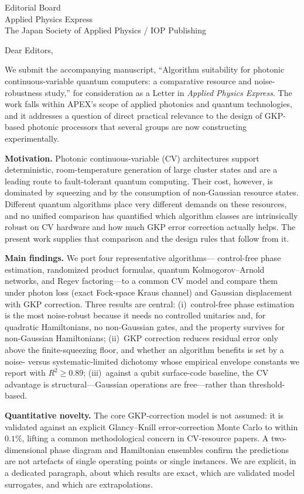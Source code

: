 \documentclass[11pt]{letter}
\begin{document}
\begin{letter}{Editorial Board \\ Applied Physics Express \\
The Japan Society of Applied Physics / IOP Publishing}

\opening{Dear Editors,}

We submit the accompanying manuscript, ``Algorithm suitability for
photonic continuous-variable quantum computers: a comparative resource
and noise-robustness study,'' for consideration as a Letter in
\emph{Applied Physics Express}. The work falls within APEX's scope of
applied photonics and quantum technologies, and it addresses a question
of direct practical relevance to the design of GKP-based photonic
processors that several groups are now constructing experimentally.

\textbf{Motivation.} Photonic continuous-variable (CV) architectures
support deterministic, room-temperature generation of large cluster
states and are a leading route to fault-tolerant quantum computing.
Their cost, however, is dominated by squeezing and by the consumption of
non-Gaussian resource states. Different quantum algorithms place very
different demands on these resources, and no unified comparison has
quantified which algorithm classes are intrinsically robust on CV
hardware and how much GKP error correction actually helps. The present
work supplies that comparison and the design rules that follow from it.

\textbf{Main findings.} We port four representative algorithms---%
control-free phase estimation, randomized product formulas, quantum
Kolmogorov--Arnold networks, and Regev factoring---to a common CV model
and compare them under photon loss (exact Fock-space Kraus channel) and
Gaussian displacement with GKP correction. Three results are central:
(i)~control-free phase estimation is the most noise-robust because it
needs no controlled unitaries and, for quadratic Hamiltonians, no
non-Gaussian gates, and the property survives for non-Gaussian
Hamiltonians; (ii)~GKP correction reduces residual error only above the
finite-squeezing floor, and whether an algorithm benefits is set by a
noise- versus systematic-limited dichotomy whose empirical envelope
constants we report with $R^{2}\!\ge\!0.89$; (iii)~against a qubit
surface-code baseline, the CV advantage is structural---Gaussian
operations are free---rather than threshold-based.

\textbf{Quantitative novelty.} The core GKP-correction model is not
assumed: it is validated against an explicit Glancy--Knill
error-correction Monte Carlo to within $0.1\%$, lifting a common
methodological concern in CV-resource papers. A two-dimensional phase
diagram and Hamiltonian ensembles confirm the predictions are not
artefacts of single operating points or single instances. We are
explicit, in a dedicated paragraph, about which results are exact, which
are validated model surrogates, and which are extrapolations.


\end{letter}
\end{document}
